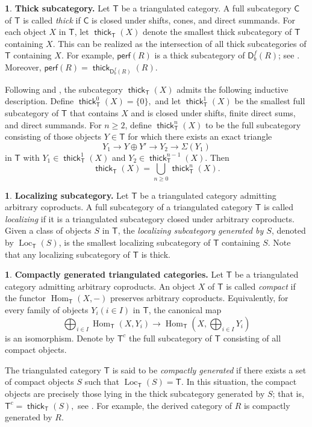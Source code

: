 \documentclass{amsart}
\newcommand{\T}{\mathsf{T}}
\newcommand{\D}{\mathsf{D}}
\newcommand{\C}{\mathsf{C}}
\newcommand{\0}{{\bf{0}}}
\DeclareMathOperator{\Hom}{Hom}
\DeclareMathOperator{\thick}{\mathsf{thick}}
\newcommand{\per}{\mathsf{perf}}
\theoremstyle{definition}
\newtheorem{chunk}[theorem]{}
\begin{document}
\begin{chunk}
\textbf{Thick subcategory.}
Let $\T$ be a triangulated category. A full subcategory $\C$ of $\T$ is called \emph{thick} if $\C$ is closed under shifts, cones, and direct summands. 
For each object $X$ in $\T$, let $\thick_\T(X)$ denote the smallest thick subcategory of $\T$ containing $X$. This can be realized as the intersection of all thick subcategories of $\T$ containing $X$. 
For example, $\per(R)$ is a thick subcategory of $\D^f_b(R)$; see \cite[Lemma 1.2.1]{Buchweitz}. Moreover, $\per(R)=\thick_{\D^f_b(R)}(R)$.

Following \cite[2.2.4]{ABIM} and \cite[Section 2]{BonVD}, the subcategory $\thick_\T(X)$ admits the following inductive description. Define
$\thick_\T^0(X)=\{0\},
$
and let $\thick_\T^1(X)$ be the smallest full subcategory of $\T$ that contains $X$ and is closed under shifts, finite direct sums, and  direct summands. For $n\geq 2$, define $\thick_\T^n(X)$ to be the full subcategory consisting of those objects $Y\in\T$ for which there exists an exact triangle
\[
Y_1\longrightarrow Y\oplus Y'\longrightarrow Y_2\longrightarrow \Sigma (Y_1)
\]
in $\T$
with
$
Y_1\in\thick_\T^1(X)$ and $
Y_2\in\thick_\T^{n-1}(X)
$.
Then
\[
\thick_\T(X)=\bigcup_{n\geq 0}\thick_\T^n(X).
\]
\end{chunk}

\begin{chunk}
    \textbf{Localizing subcategory.}
    Let $\T$ be a triangulated category admitting arbitrary coproducts. 
A full subcategory of a triangulated category $\T$ is called \emph{localizing} if it is a triangulated subcategory closed under arbitrary coproducts. Given a class of objects $S$ in $\T$, the \emph{localizing subcategory generated by $S$}, denoted by $\operatorname{Loc}_{\T}(S)$, is the smallest localizing subcategory of $\T$ containing $S$. Note that any localizing subcategory of $\T$ is thick.
\end{chunk}
 
 \begin{chunk}\label{compactly gen}
     \textbf{Compactly generated triangulated categories.}
Let $\T$ be a triangulated category admitting arbitrary coproducts. An object $X$ of $\T$ is called \emph{compact} if the functor $\Hom_{\T}(X,-)$ preserves arbitrary coproducts. Equivalently, for every family of objects $Y_i(i\in I)$ in $\T$, the canonical map
$$
\bigoplus_{i\in I}\Hom_{\T}(X,Y_i)\longrightarrow  \Hom_{\T}(X,\bigoplus_{i\in I}Y_i)
$$
is an isomorphism. Denote by $\T^{c}$ the full subcategory of $\T$ consisting of all compact objects. 

The triangulated category $\T$ is said to be \emph{compactly generated} if there exists a set of compact objects $S$ such that
$
\operatorname{Loc}_\T(S)=\T.
$
In this situation, the compact objects are precisely those lying in the thick subcategory generated by $S$; that is,
$
\T^{c}=\thick_{\T}(S),
$ 
see \cite[Lemma 2.2]{Neeman92}. For example, the derived category of $R$ is compactly generated by $R$. 
 \end{chunk}
\end{document}
